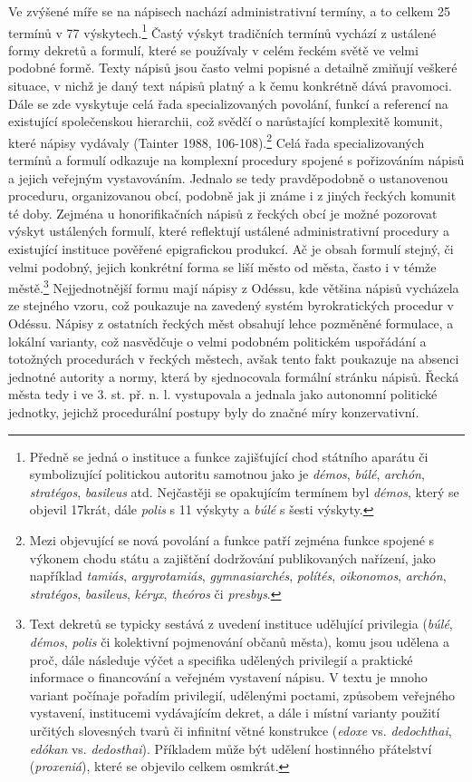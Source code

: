 Ve zvýšené míře se na nápisech nachází administrativní termíny, a to celkem 25 termínů v 77 výskytech.\footnote{Předně se jedná o instituce a funkce zajišťující chod státního aparátu či symbolizující politickou autoritu samotnou jako je {\em démos}, {\em búlé}, {\em archón}, {\em stratégos}, {\em basileus} atd. Nejčastěji se opakujícím termínem byl {\em démos}, který se objevil 17krát, dále {\em polis} s 11 výskyty a {\em búlé} s šesti výskyty.} Častý výskyt tradičních termínů vychází z ustálené formy dekretů a formulí, které se používaly v celém řeckém světě ve velmi podobné formě. Texty nápisů jsou často velmi popisné a detailně zmiňují veškeré situace, v nichž je daný text nápisů platný a k čemu konkrétně dává pravomoci. Dále se zde vyskytuje celá řada specializovaných povolání, funkcí a referencí na existující společenskou hierarchii, což svědčí o narůstající komplexitě komunit, které nápisy vydávaly (Tainter 1988, 106-108).\footnote{Mezi objevující se nová povolání a funkce patří zejména funkce spojené s výkonem chodu státu a zajištění dodržování publikovaných nařízení, jako například {\em tamiás}, {\em argyrotamiás}, {\em gymnasiarchés}, {\em polítés}, {\em oikonomos}, {\em archón}, {\em stratégos}, {\em basileus}, {\em kéryx}, {\em theóros} či {\em presbys}.} Celá řada specializovaných termínů a formulí odkazuje na komplexní procedury spojené s pořizováním nápisů a jejich veřejným vystavováním. Jednalo se tedy pravděpodobně o ustanovenou proceduru, organizovanou obcí, podobně jak ji známe i z jiných řeckých komunit té doby. Zejména u honorifikačních nápisů z řeckých obcí je možné pozorovat výskyt ustálených formulí, které reflektují ustálené administrativní procedury a existující instituce pověřené epigrafickou produkcí. Ač je obsah formulí stejný, či velmi podobný, jejich konkrétní forma se liší město od města, často i v témže městě.\footnote{Text dekretů se typicky sestává z uvedení instituce udělující privilegia ({\em búlé}, {\em démos}, {\em polis} či kolektivní pojmenování občanů města), komu jsou udělena a proč, dále následuje výčet a specifika udělených privilegií a praktické informace o financování a veřejném vystavení nápisu. V textu je mnoho variant počínaje pořadím privilegií, udělenými poctami, způsobem veřejného vystavení, institucemi vydávajícím dekret, a dále i místní varianty použití určitých slovesných tvarů či infinitní větné konstrukce ({\em edoxe} vs. {\em dedochthai}, {\em edókan} vs. {\em dedosthai}). Příkladem může být udělení hostinného přátelství ({\em proxeniá}), které se objevilo celkem osmkrát.} Nejjednotnější formu mají nápisy z Odéssu, kde většina nápisů vycházela ze stejného vzoru, což poukazuje na zavedený systém byrokratických procedur v Odéssu. Nápisy z ostatních řeckých měst obsahují lehce pozměněné formulace, a lokální varianty, což nasvědčuje o velmi podobném politickém uspořádání a totožných procedurách v řeckých městech, avšak tento fakt poukazuje na absenci jednotné autority a normy, která by sjednocovala formální stránku nápisů. Řecká města tedy i ve 3. st. př. n. l. vystupovala a jednala jako autonomní politické jednotky, jejichž procedurální postupy byly do značné míry konzervativní.

